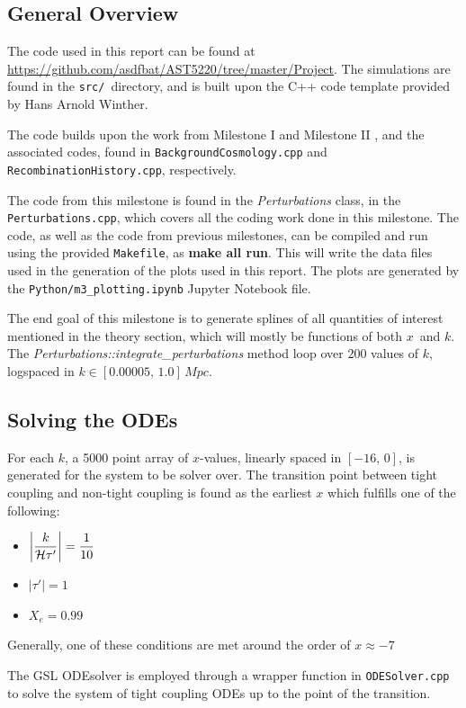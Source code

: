 \documentclass[10pt, a4paper]{article}
\begin{document}
\subsection{General Overview}
The code used in this report can be found at \url{https://github.com/asdfbat/AST5220/tree/master/Project}. The simulations are found in the \texttt{src/} directory, and is built upon the C++ code template provided by Hans Arnold Winther.

The code builds upon the work from Milestone I \cite{Milestone1} and Milestone II \cite{Milestone2}, and the associated codes, found in \texttt{BackgroundCosmology.cpp} and \texttt{RecombinationHistory.cpp}, respectively.

The code from this milestone is found in the \textit{Perturbations} class, in the \texttt{Perturbations.cpp}, which covers all the coding work done in this milestone. The code, as well as the code from previous milestones, can be compiled and run using the provided \texttt{Makefile}, as \textbf{make all run}. This will write the data files used in the generation of the plots used in this report. The plots are generated by the \texttt{Python/m3\_plotting.ipynb} Jupyter Notebook file.

The end goal of this milestone is to generate splines of all quantities of interest mentioned in the theory section, which will mostly be functions of both $x$ and $k$. The \textit{Perturbations::integrate\_perturbations} method loop over 200 values of $k$, logspaced in $k\in [0.00005,\, 1.0]\, \si{Mpc}$.

\subsection{Solving the ODEs}
For each $k$, a 5000 point array of $x$-values, linearly spaced in $[-16,\, 0]$, is generated for the system to be solver over. The transition point between tight coupling and non-tight coupling is found as the earliest $x$ which fulfills one of the following:
\begin{itemize}
    \item $\qty|\dfrac{k}{\mathcal{H}\tau'}| = \dfrac{1}{10}$
    \item $|\tau'| = 1$
    \item $X_e = 0.99$\quad {}
\end{itemize}
Generally, one of these conditions are met around the order of $x \approx -7$

The GSL ODEsolver is employed through a wrapper function in \texttt{ODESolver.cpp} to solve the system of tight coupling ODEs up to the point of the transition.
\end{document}
